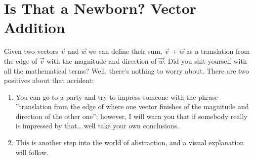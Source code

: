 \documentclass[600paper, 11pt,twoside,openany]{kdp}
\begin{document}
\section{Is That a Newborn? Vector Addition}
\indent Given two vectors $\overrightarrow{v}$ and $\overrightarrow{w}$ we can define their sum, $\overrightarrow{v}$ + $\overrightarrow{w}$ as a translation from the edge of $\overrightarrow{v}$ with the magnitude and direction of $\overrightarrow{w}$. Did you shit yourself with  all the mathematical terms? Well, there’s nothing to worry about. There are two positives about that accident:
\begin{enumerate}
\item You can go to a party and try to impress someone with the phrase ”translation from the edge of where one vector finishes of the magnitude and direction of the other one”; however, I will warn you that if somebody really is impressed by that… well take your own conclusions.
\item This is another step into the world of abstraction, and a visual explanation will follow.
\end{enumerate}
\end{document}
